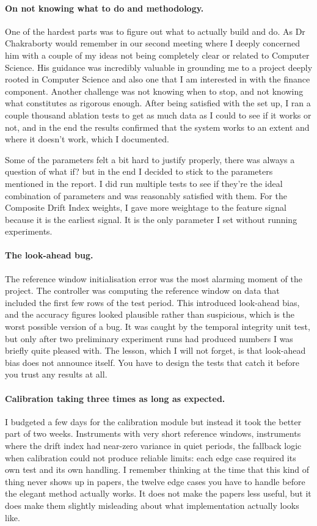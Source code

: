 \begin{appendices}
\paragraph{On not knowing what to do and methodology.}
One of the hardest parts was to figure out what to actually build and do. As Dr Chakraborty would remember in our second meeting where I deeply concerned him with a couple of my ideas not being completely clear or related to Computer Science. His guidance was incredibly valuable in grounding me to a project deeply rooted in Computer Science and also one that I am interested in with the finance component. Another challenge was not knowing when to stop, and not knowing what constitutes as rigorous enough. After being satisfied with the set up, I ran a couple thousand ablation tests to get as much data as I could to see if it works or not, and in the end the results confirmed that the system works to an extent and where it doesn't work, which I documented. 

Some of the parameters felt a bit hard to justify properly, there was always a question of what if? but in the end I decided to stick to the parameters mentioned in the report. I did run multiple tests to see if they're the ideal combination of parameters and was reasonably satisfied with them. For the Composite Drift Index weights, I gave more weightage to the feature signal because it is the earliest signal. It is the only parameter I set without running experiments. 

\paragraph{The look-ahead bug.}
The reference window initialisation error was the most alarming moment of the project. 
The controller was computing the reference window on data that included the first few 
rows of the test period. This introduced look-ahead bias, and the accuracy figures 
looked plausible rather than suspicious, which is the worst possible version of a bug. 
It was caught by the temporal integrity unit test, but only after two preliminary 
experiment runs had produced numbers I was briefly quite pleased with. The lesson, 
which I will not forget, is that look-ahead bias does not announce itself. You have to 
design the tests that catch it before you trust any results at all.

\paragraph{Calibration taking three times as long as expected.}
I budgeted a few days for the calibration module but instead it took the better part of two weeks. 
Instruments with very short reference windows, instruments where the drift index had 
near-zero variance in quiet periods, the fallback logic when calibration could not 
produce reliable limits: each edge case required its own test and its own handling. 
I remember thinking at the time that this kind of thing never shows up in papers, the 
twelve edge cases you have to handle before the elegant method actually works. It does 
not make the papers less useful, but it does make them slightly misleading about what 
implementation actually looks like.


\end{appendices}
